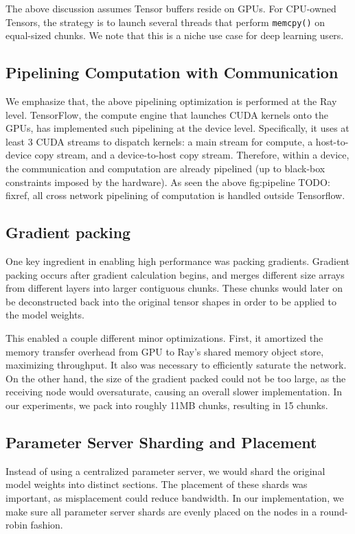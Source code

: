 The above discussion assumes Tensor buffers reside on GPUs.  For CPU-owned Tensors, the strategy is to launch several threads that perform \texttt{memcpy()} on equal-sized chunks.  We note that this is a niche use case for deep learning users.

\subsection{Pipelining Computation with Communication}

We emphasize that, the above pipelining optimization is performed at the Ray level.  TensorFlow, the compute engine that launches CUDA kernels onto the GPUs, has implemented such pipelining at the device level.  Specifically, it uses at least 3 CUDA streams to dispatch kernels: a main stream for compute, a host-to-device copy stream, and a device-to-host copy stream.  Therefore, within a device, the communication and computation are already pipelined (up to black-box constraints imposed by the hardware).
As seen the above fig:pipeline {\color{red} TODO: {fixref}}, all cross network pipelining of computation is handled outside Tensorflow.



\subsection{Gradient packing}
One key ingredient in enabling high performance was packing gradients. Gradient packing occurs after gradient calculation begins, and merges different size arrays from different layers into larger contiguous chunks. These chunks would later on be deconstructed back into the original tensor shapes in order to be applied to the model weights.

This enabled a couple different minor optimizations. First, it amortized the memory transfer overhead from GPU to Ray's shared memory object store, maximizing throughput. It also was necessary to efficiently saturate the network. On the other hand, the size of the gradient packed could not be too large, as the receiving node would oversaturate, causing an overall slower implementation. In our experiments, we pack into roughly 11MB chunks, resulting in 15 chunks.

\subsection{Parameter Server Sharding and Placement}
Instead of using a centralized parameter server, we would shard the original model weights into distinct sections. The placement of these shards was important, as misplacement could reduce bandwidth. In our implementation, we make sure all parameter server shards are evenly placed on the nodes in a round-robin fashion.

